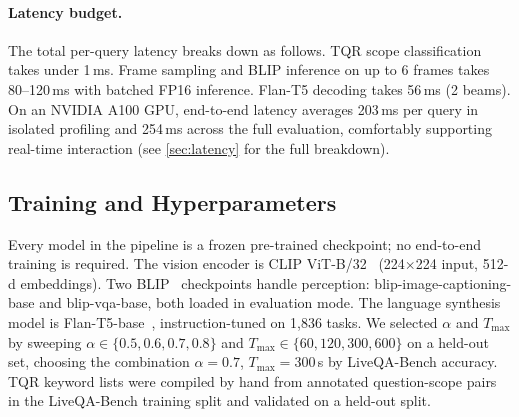 \paragraph{Latency budget.}
The total per-query latency breaks down as follows. TQR scope classification takes under 1\,ms. Frame sampling and BLIP inference on up to 6 frames takes 80--120\,ms with batched FP16 inference. Flan-T5 decoding takes 56\,ms (2 beams).
On an NVIDIA A100 GPU, end-to-end latency averages 203\,ms per query in isolated profiling and 254\,ms across the full evaluation, comfortably supporting real-time interaction (see \cref{sec:latency} for the full breakdown).


\subsection{Training and Hyperparameters}
\label{sec:training}

Every model in the pipeline is a frozen pre-trained checkpoint; no end-to-end training is required.
The vision encoder is CLIP ViT-B/32~\cite{radford2021clip} (224$\times$224 input, 512-d embeddings).
Two BLIP~\cite{li2022blip} checkpoints handle perception: blip-image-captioning-base and blip-vqa-base, both loaded in evaluation mode.
The language synthesis model is Flan-T5-base~\cite{chung2022flanT5}, instruction-tuned on 1,836 tasks.
We selected $\alpha$ and $T_{\max}$ by sweeping $\alpha \in \{0.5, 0.6, 0.7, 0.8\}$ and $T_{\max} \in \{60, 120, 300, 600\}$ on a held-out set, choosing the combination $\alpha = 0.7$, $T_{\max} = 300$\,s by LiveQA-Bench accuracy.
TQR keyword lists were compiled by hand from annotated question-scope pairs in the LiveQA-Bench training split and validated on a held-out split.
